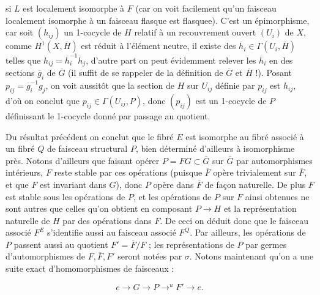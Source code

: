 
\noindent si $L$ est localement isomorphe à $F$ (car on voit facilement
qu'un faisceau localement isomorphe à un faisceau flasque est flasquee).
C'est un épimorphisme, car soit $(h_{ij})$ un 1-cocycle de $H$ relatif à un
recouvrement ouvert $(U_i)$ de $X$, comme $H^1(X,\overline H)$ est réduit à
l'élément neutre, il existe des $\overline h_i\in\Gamma(U_i,\overline H)$
telles que $h_{ij}=\overline h_i^{-1}\overline h_j$, d'autre part on peut
évidemment relever les $\overline h_i$ en des sections $\overline g_i$ de
$\overline G$ (il suffit de se rappeler de la définition de $\overline G$ et
$\overline H$ !). Posant $p_{ij}=\overline g_i^{-1}g_j$, on voit
aussitôt que la section de $H$ sur $U_{ij}$ définie par $p_{ij}$ est $h_{ij}$,
d'où on conclut que $p_{ij}\in\Gamma(U_{ij},P)$, donc $(p_{ij})$ est un
1-cocycle de $P$ définissant le 1-cocycle donné par passage au quotient.

Du résultat précédent on conclut que le fibré $E$ est isomorphe au fibré
associé à un fibré $Q$ de faisceau structural $P$, bien déterminé d'ailleurs
à isomorphisme près.
Notons d'ailleurs que faisant opérer
$P=F G\subset\overline G$ sur $\overline G$ par automorphismes
intérieurs, $F$ reste stable par ces opérations (puisque $\overline F$ opère
trivialement sur $\overline F$, et que $F$ est invariant dans $G$), donc $P$
opère dans $\overline F$ de façon naturelle. De plus $F$ est stable sous les
opérations de $P$, et les opérations de $P$ sur $F$ ainsi obtenues ne sont
autres que celles qu'on obtient en composant $P\to H$ et la
représentation naturelle de $H$ par des opérations dans $F$. De ceci on
déduit donc que le faisceau associé $F^E$ s'identifie aussi au faisceau
associé $F^Q$. Par ailleurs, les opérations de $P$ passent aussi au quotient
$F'=\overline F/F$ ; les représentations de $P$ par germes d'automorphismes
de $F,\overline F,F'$ seront notées par $\sigma$. Notons maintenant qu'on a
une suite exact d'homomorphismes de faisceaux :

\[
e\to G\to P\mathop{\to}^{u}F'
\to e.
\]

